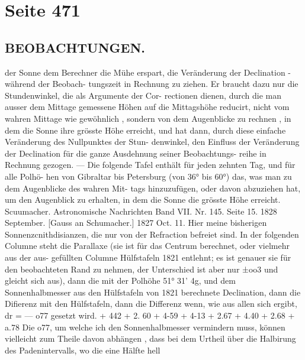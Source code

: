 \documentclass[10pt,a4paper]{article}
\begin{document}
\newpage
\section*{Seite 471}

\subsection*{BEOBACHTUNGEN.}

der  Sonne  dem  Berechner  die  Mühe  erspart,  die  Veränderung  der  Declination  -während  der  Beobach-
tungszeit in  Rechnung  zu  ziehen.  Er  braucht  dazu  nur  die  Stundenwinkel,  die  als  Argumente  der  Cor-
rectionen  dienen,  durch  die  man  ausser  dem  Mittage  gemessene  Höhen  auf  die  Mittagshöhe  reducirt,
nicht  vom  wahren  Mittage  wie  gewöhnlich ,  sondern  von  dem  Augenblicke  zu  rechnen ,  in  dem  die  Sonne
ihre  grösste  Höhe  erreicht,  und  hat  dann,  durch  diese  einfache  Veränderung  des  Nullpunktes  der  Stun-
denwinkel, den  Einfluss  der  Veränderung  der  Declination  für  die  ganze  Ausdehnung  seiner  Beobachtungs-
reihe in  Rechnung  gezogen.  ---  \glqq{}  Die  folgende  Tafel  enthält  für  jeden  zehnten  Tag,  und  für  alle  Polhö-
hen von  Gibraltar  bis  Petersburg  (von  36°  bis  60°)  das,  was  man  zu  dem  Augenblicke  des  wahren  Mit-
tags hinzuzufügen,  oder  davon  abzuziehen  hat,  um  den  Augenblick  zu  erhalten,  in  dem  die  Sonne  die
grösste  Höhe  erreicht.     Scuumacher.
Astronomische  Nachrichten  Band  VII.  Nr.  145.  Seite  15.     1828  September.
[Gauss  an  Schumacher.]      1827  Oct.  11.
Hier  meine  bisherigen  Sonnenzcnithdisianzen,  die  nur  von  der  Refraction  befreiet  sind.  In  der
folgenden  Columne  steht  die  Parallaxe  (sie  ist  für  das  Centrum  berechnet,  oder  vielmehr  aus  der  aus-
gefüllten Columne  Hülfstafeln  1821  entlehnt;  es  ist  genauer  sie  für  den  beobachteten  Rand  zu  nehmen,
der  Unterschied  ist  aber  nur  ±o\glqq{}o3  und  gleicht  sich  aus),  dann  die  mit  der  Polhöhe  51°  31'  4g\glqq{},  und
dem  Sonnenhalbmesser  aus  den  Hülfstafeln  von  1821  berechnete  Declination,  dann  die  Difierenz  mit  den
Hülfstafeln,  dann  die  Differenz  wenn,  wie  aus  allen  sich  ergibt,    dr  =  --- o\glqq{}77    gesetzt  wird.
+  4\glqq{}42
+  2.  60
+  4-59
+  4-13
+  2.67
+  4.40
+  2.68
+  a.78
Die  o\glqq{}77,  um  welche  ich  den  Sonnenhalbmesser  vermindern  muss,  können  vielleicht  zum  Theile
davon  abhängen ,  dass  bei  dem  Urtheil  über  die  Halbirung  des  Padenintervalls,  wo  die  eine  Hälfte  hell
\end{document}

